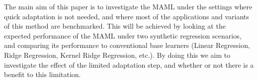 The main aim of this paper is to investigate the MAML under the settings where quick adaptation is not needed, and where most of the applications and variants of this method are benchmarked. This will be achieved by looking at the expected performance of the MAML under two synthetic regression scenarios, and comparing its performance to conventional base learners (\eg Linear Regression, Ridge Regression, Kernel Ridge Regression, etc.). By doing this we aim to investigate the effect of the limited adaptation step, and whether or not there is a benefit to this limitation. %


